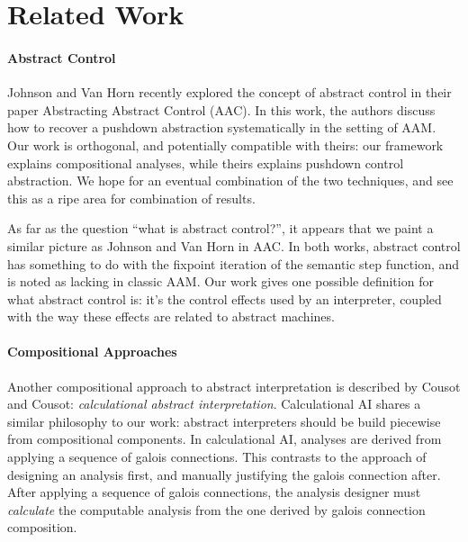\documentclass{article}
\begin{document}
\section{Related Work}
\label{RelatedWork}
\paragraph{Abstract Control}
Johnson and Van Horn recently explored the concept of abstract control in their paper Abstracting Abstract Control (AAC)\cite{AAC}.
In this work, the authors discuss how to recover a pushdown abstraction systematically in the setting of AAM.
Our work is orthogonal, and potentially compatible with theirs: our framework explains compositional analyses, while theirs explains pushdown control abstraction.
We hope for an eventual combination of the two techniques, and see this as a ripe area for combination of results.

As far as the question “what is abstract control?”, it appears that we paint a similar picture as Johnson and Van Horn in AAC.
In both works, abstract control has something to do with the fixpoint iteration of the semantic step function, and is noted as lacking in classic AAM.
Our work gives one possible definition for what abstract control is: it's the control effects used by an interpreter, coupled with the way these effects are related to abstract machines.

\paragraph{Compositional Approaches}
Another compositional approach to abstract interpretation is described by Cousot and Cousot: \emph{calculational abstract interpretation}\cite{CalculationalAI}.
Calculational AI shares a similar philosophy to our work: abstract interpreters should be build piecewise from compositional components.
In calculational AI, analyses are derived from applying a sequence of galois connections.
This contrasts to the approach of designing an analysis first, and manually justifying the galois connection after.
After applying a sequence of galois connections, the analysis designer must \emph{calculate} the computable analysis from the one derived by galois connection composition.
\end{document}
